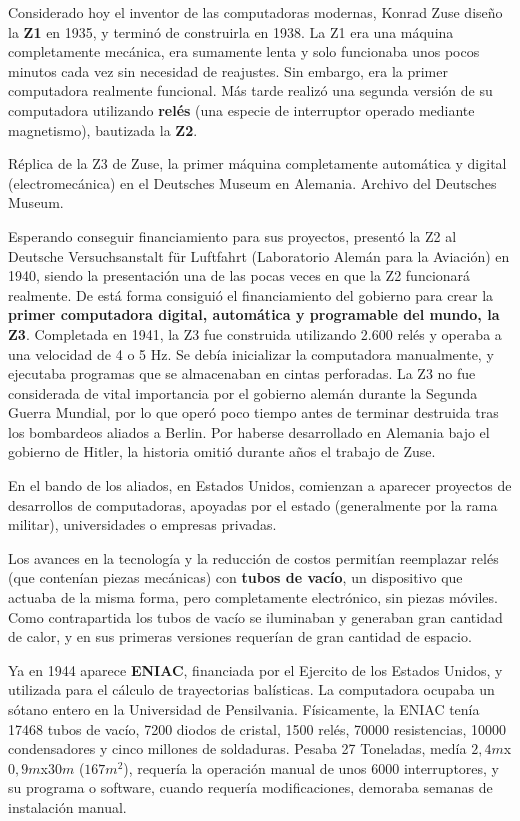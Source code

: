  Considerado hoy el inventor de las
computadoras modernas, Konrad Zuse diseño la \textbf{Z1} en 1935, y terminó de
construirla en 1938. La Z1 era una máquina completamente mecánica, era sumamente
lenta y solo funcionaba unos pocos minutos cada vez sin necesidad de reajustes.
Sin embargo, era la primer computadora realmente funcional. Más tarde realizó
una segunda versión de su computadora utilizando \textbf{relés} (una especie de
interruptor operado mediante magnetismo), bautizada la \textbf{Z2}.

{Réplica de la Z3 de Zuse, la primer máquina completamente automática y digital
(electromecánica) en el Deutsches Museum en Alemania.} {Archivo del Deutsches
Museum.}

Esperando conseguir financiamiento para sus proyectos, presentó la Z2 al
Deutsche Versuchsanstalt f\"{u}r Luftfahrt (Laboratorio Alemán para la Aviación)
en 1940, siendo la presentación una de las pocas veces en que la Z2 funcionará
realmente. De está forma consiguió el financiamiento del gobierno para crear la
\textbf{primer computadora digital, automática y programable del mundo, la Z3}.
Completada en 1941, la Z3 fue construida utilizando 2.600 relés y operaba a una
velocidad de 4 o 5 Hz. Se debía inicializar la computadora manualmente, y
ejecutaba programas que se almacenaban en cintas perforadas. La Z3 no fue
considerada de vital importancia por el gobierno alemán durante la Segunda
Guerra Mundial, por lo que operó poco tiempo antes de terminar destruida tras
los bombardeos aliados a Berlin. Por haberse desarrollado en Alemania bajo el
gobierno de Hitler, la historia omitió durante años el trabajo de Zuse.
\autocite[cap. I]{ceruzzi_2003}

En el bando de los aliados, en Estados Unidos, comienzan a aparecer proyectos de
desarrollos de computadoras, apoyadas por el estado (generalmente por la rama
militar), universidades o empresas privadas.

Los avances en la tecnología y la reducción de costos permitían reemplazar relés
(que contenían piezas mecánicas) con \textbf{tubos de vacío}, un dispositivo que
actuaba de la misma forma, pero completamente electrónico, sin piezas móviles.
Como contrapartida los tubos de vacío se iluminaban y generaban gran cantidad de
calor, y en sus primeras versiones requerían de gran cantidad de espacio.

Ya en 1944 aparece \textbf{ENIAC}, financiada por el Ejercito de los Estados
Unidos, y utilizada para el cálculo de trayectorias balísticas. La computadora
ocupaba un sótano entero en la Universidad de Pensilvania. Físicamente, la ENIAC
tenía 17468 tubos de vacío, 7200 diodos de cristal, 1500 relés, 70000
resistencias, 10000 condensadores y cinco millones de soldaduras. Pesaba 27
Toneladas, medía $2,4m$x$0,9m$x$30m$ ($167m^2$), requería la operación manual de
unos 6000 interruptores, y su programa o software, cuando requería
modificaciones, demoraba semanas de instalación manual.
\autocite[p. 59]{ceruzzi_2012}

